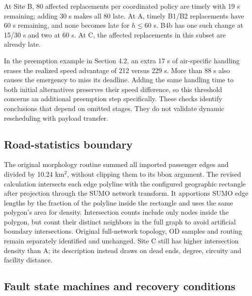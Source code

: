 \documentclass[11pt,a4paper]{article}
\begin{document}
\begingroup
\setlength{\intextsep}{6pt}
\setlength{\belowcaptionskip}{3pt}

\endgroup

At Site B, 80 affected replacements per coordinated policy are timely with 19 s remaining; adding 30 s makes all 80 late. At A, timely B1/B2 replacements have 60 s remaining, and none becomes late for $h\le60$ s. B4b has one such change at 15/30 s and two at 60 s. At C, the affected replacements in this subset are already late.

In the preemption example in Section 4.2, an extra 17 s of air-specific handling erases the realized speed advantage of 212 versus 229 s. More than 88 s also causes the emergency to miss its deadline. Adding the same handling time to both initial alternatives preserves their speed difference, so this threshold concerns an additional preemption step specifically. These checks identify conclusions that depend on omitted stages. They do not validate dynamic rescheduling with payload transfer.

\subsection{Road-statistics boundary}

The original morphology routine summed all imported passenger edges and divided by 10.24 km$^2$, without clipping them to its bbox argument. The revised calculation intersects each edge polyline with the configured geographic rectangle after projection through the SUMO network transform. It apportions SUMO edge lengths by the fraction of the polyline inside the rectangle and uses the same polygon's area for density. Intersection counts include only nodes inside the polygon, but count their distinct neighbors in the full graph to avoid artificial boundary intersections. Original full-network topology, OD samples and routing remain separately identified and unchanged. Site C still has higher intersection density than A; its description instead draws on dead ends, degree, circuity and facility distance.

\subsection{Fault state machines and recovery conditions}
\end{document}

